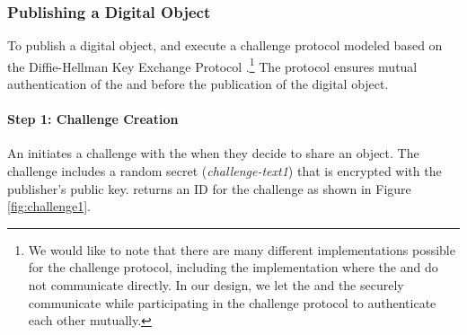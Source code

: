 \subsubsection{Publishing a Digital Object}
\label{sec:pub-object}


To publish a digital object, \owner and \publisher execute a challenge protocol modeled based on the Diffie-Hellman Key Exchange Protocol \cite{dh-key-exchange}.\footnote{We would like to note that there are many different implementations possible for the challenge protocol, including the implementation where the \owner and \publisher do not communicate directly. In our design, we let the \owner and the \publisher securely communicate while participating in the challenge protocol to authenticate each other mutually.} The protocol ensures mutual authentication of the \owner and \publisher before the publication of the digital object. 

\paragraph{Step 1: Challenge Creation}

An \owner initiates a challenge with the \ta when they decide to share an object. The challenge includes a random secret ({\em challenge-text1}) that is encrypted with the publisher's public key. \ta returns an ID for the challenge as shown in Figure \ref{fig:challenge1}. 

